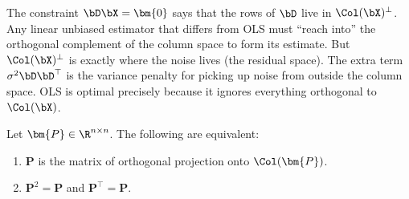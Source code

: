 \begin{remark}
The constraint $\bD\bX = \bm{0}$ says that the rows of $\bD$ live in
$\Col(\bX)^\perp$.  Any linear unbiased estimator that differs from OLS
must ``reach into'' the orthogonal complement of the column space to
form its estimate.  But $\Col(\bX)^\perp$ is exactly where the noise lives
(the residual space).  The extra term $\sigma^2\bD\bD^\top$ is the
variance penalty for picking up noise from outside the column space.
OLS is optimal precisely because it ignores everything orthogonal to
$\Col(\bX)$.
\end{remark}



\begin{theorem}\label{thm:proj-char}
Let $\bm{P}\in\R^{n\times n}$.  The following are equivalent:
\begin{enumerate}[nosep,label=(\alph*)]
  \item $\bm{P}$ is the matrix of orthogonal projection onto $\Col(\bm{P})$.
  \item $\bm{P}^2 = \bm{P}$ and $\bm{P}^\top = \bm{P}$.
\end{enumerate}
\end{theorem}

